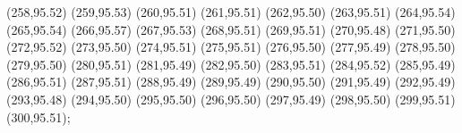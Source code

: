 {(258,95.52) (259,95.53) (260,95.51) (261,95.51) (262,95.50) (263,95.51) (264,95.54) (265,95.54) (266,95.57) (267,95.53) (268,95.51) (269,95.51) (270,95.48) (271,95.50) (272,95.52) (273,95.50) (274,95.51) (275,95.51) (276,95.50) (277,95.49) (278,95.50) (279,95.50) (280,95.51) (281,95.49) (282,95.50) (283,95.51) (284,95.52) (285,95.49) (286,95.51) (287,95.51) (288,95.49) (289,95.49) (290,95.50) (291,95.49) (292,95.49) (293,95.48) (294,95.50) (295,95.50) (296,95.50) (297,95.49) (298,95.50) (299,95.51) (300,95.51)};
